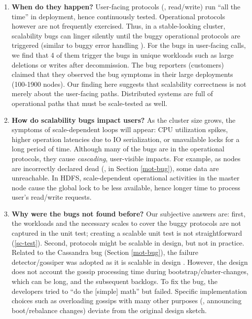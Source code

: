 \begin{enumerate}
\item {\bf When do they happen?}  User-facing protocols (\eg, read/write)
run ``all the time'' in deployment, hence continuously tested.
%
Operational protocols however are not frequently exercised.  Thus, in a
stable-looking cluster, scalability bugs can linger silently until the
buggy operational protocols are triggered (similar to buggy error handling
\cite{Yuan+14-SimpleTesting}).
%
For the bugs in user-facing calls, we find that 4 of them trigger the bugs
in unique workloads such as large deletions or writes after decommission.
%
The bug reporters (customers) claimed that they observed the bug symptoms
in their large deployments (100-1900 nodes).
%
Our finding here suggests that scalability correctness is not merely about
the user-facing paths.  Distributed systems are full of operational paths
that must be scale-tested as well.


\item {\bf How do scalability bugs impact users?}
%
As the cluster size grows, the symptoms of scale-dependent loops will
appear: CPU utilization spikes, higher operation latencies due to IO
serialization, or unavailable locks for a long period of time.
Although many of the bugs are in the operational protocols, they
cause {\em cascading}, user-visible impacts.
%
For example, as nodes are incorrectly declared dead (\eg, in Section
\ref{mot-bug}), some data are unreachable.
%
In HDFS, scale-dependent operational activities in the master node cause
the global lock to be less available, hence longer time to
process user's read/write requests.

\item {\bf Why were the bugs not found before?}  Our subjective answers are:
%
first, the workloads and the necessary scales to cover the buggy protocols
are not captured in the unit test; creating a scalable unit test is not
straightforward (\sec\ref{sc-test}).
%
Second, protocols might be scalable in design, but not in practice.
Related to the Cassandra bug (Section \ref{mot-bug}), the failure
detector/gossiper \cite{Hayashibara+04-PhiFailureDetector} was adopted
as it is scalable in design \cite{Lakshman+09-Cassandra}.  However,
the design does not account the gossip processing time during
bootstrap/cluster-changes, which can be long, and the subsequent
backlogs.  To fix the bug, the developers tried to ``do the [simple]
math'' \cite{CA-One} but failed.  Specific implementation choices such
as overloading gossips with many other purposes (\eg, announcing
boot/rebalance changes) deviate from the original design sketch.




\end{enumerate}
